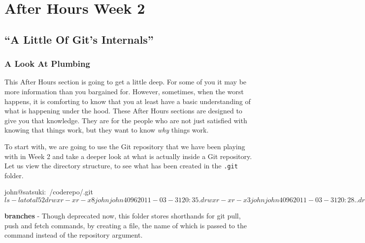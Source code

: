 \chapter{After Hours Week 2}
\section{``A Little Of Git's Internals''}
\subsection{A Look At Plumbing}
This After Hours section is going to get a little deep.
For some of you it may be more information than you bargained for.
However, sometimes, when the worst happens, it is comforting to know that you at least have a basic understanding of what is happening under the hood.
These After Hours sections are designed to give you that knowledge.
They are for the people who are not just satisfied with knowing that things work, but they want to know \emph{why} things work.

To start with, we are going to use the Git repository that we have been playing with in Week 2 and take a deeper look at what is actually inside a Git repository.
Let us view the directory structure, to see what has been created in the \texttt{.git} folder.

\begin{code}
john@satsuki:~/coderepo/.git$ ls -la
total 52
drwxr-xr-x  8 john john 4096 2011-03-31 20:35 .
drwxr-xr-x  3 john john 4096 2011-03-31 20:28 ..
drwxr-xr-x  2 john john 4096 2011-03-31 20:22 branches
-rw-r--r--  1 john john   30 2011-03-31 20:34 COMMIT_EDITMSG
-rw-r--r--  1 john john   92 2011-03-31 20:22 config
-rw-r--r--  1 john john   73 2011-03-31 20:22 description
-rw-r--r--  1 john john   23 2011-03-31 20:22 HEAD
drwxr-xr-x  2 john john 4096 2011-03-31 20:22 hooks
-rw-r--r--  1 john john  208 2011-03-31 20:35 index
drwxr-xr-x  2 john john 4096 2011-03-31 20:22 info
drwxr-xr-x  3 john john 4096 2011-03-31 20:27 logs
drwxr-xr-x 13 john john 4096 2011-03-31 20:34 objects
drwxr-xr-x  4 john john 4096 2011-03-31 20:22 refs
john@satsuki:~/coderepo/.git$
\end{code}

\textbf{branches} - Though deprecated now, this folder stores shorthands for git pull, push and fetch commands, by creating a file, the name of which is passed to the command instead of the repository argument.

